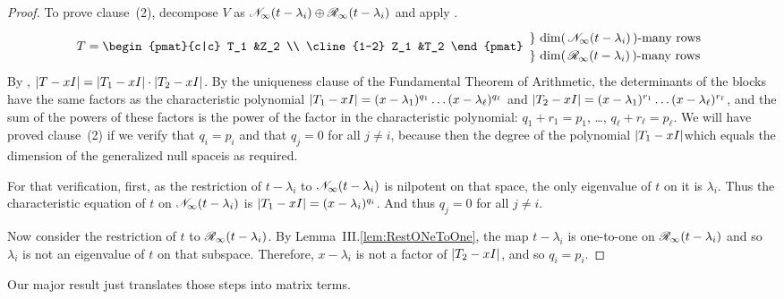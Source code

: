\begin{proof}
To prove clause~(2), decompose \( V \) as 
\( \mathscr{N}_\infty(t-\lambda_i)\oplus\mathscr{R}_\infty(t-\lambda_i) \)
and apply .
\begin{equation*}   \renewcommand{\arraystretch}{1.2}
  T=
  \begin{pmat}{c|c}
      T_1   &Z_2  \\  \cline{1-2}
      Z_1   &T_2
   \end{pmat}
   \begin{array}{ll}
     \} \text{\ $\dim(\,\gennullspace{t-\lambda_i}\,)$-many rows}  \\
     \} \text{\ $\dim(\,\genrangespace{t-\lambda_i}\,)$-many rows}
   \end{array}
\end{equation*}
By ,
\( \deter{T-xI}=\deter{T_1-xI}\cdot\deter{T_2-xI} \).
By the uniqueness clause of the Fundamental Theorem of Arithmetic,
the determinants of the blocks have the same factors as the
characteristic polynomial
\( \deter{T_1-xI}=(x-\lambda_1)^{q_1}\dots(x-\lambda_\ell)^{q_\ell} \)
and
\( \deter{T_2-xI}=(x-\lambda_1)^{r_1}\dots(x-\lambda_\ell)^{r_\ell} \),
and the sum of the powers of these factors is the power of the factor
in the characteristic polynomial:
\( q_1+r_1=p_1 \), \dots, \( q_\ell+r_\ell=p_\ell \).
We will have proved clause~(2) if we verify that $q_i=p_i$ and that
$q_j=0$ for all $j\neq i$, because then the degree of 
the polynomial $\deter{T_1-xI}$\Dash which equals the dimension of the
generalized null space\Dash is as required.

For that verification, first,
as the restriction of \( t-\lambda_i \) to \( \mathscr{N}_\infty(t-\lambda_i) \)
is nilpotent on that space,
the only eigenvalue of \( t \) on it is \( \lambda_i \).
Thus the characteristic equation of \( t \) on
\( \mathscr{N}_\infty(t-\lambda_i) \) is
\( \deter{T_1-xI}=(x-\lambda_i)^{q_i} \).
And thus $q_j=0$ for all $j\neq i$.

Now consider the restriction of \( t \) to \( \mathscr{R}_\infty(t-\lambda_i) \).
By Lemma~III.\ref{lem:RestONeToOne}, the map
\( t-\lambda_i \) is one-to-one on
\( \mathscr{R}_\infty(t-\lambda_i) \) and so \( \lambda_i \) is not an
eigenvalue of \( t \) on that subspace.
Therefore, \( x-\lambda_i \) is not a factor of \( \deter{T_2-xI} \),
and so \( q_i=p_i \).
\end{proof}

Our major result just
translates those steps into matrix terms.

